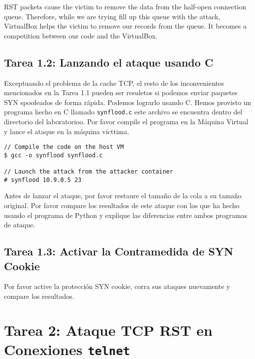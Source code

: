 RST packets cause the victim to remove the data from the half-open connection
queue. Therefore, while we are trying fill up this queue with the attack, 
VirtualBox helps the victim to remove our records from the queue. 
It becomes a competition between our code and the VirtualBox. 


\subsection{Tarea 1.2: Lanzando el ataque usando C} 

Exceptuando el problema de la cache TCP, el resto de los inconvenientes mencionados en la Tarea 1.1 pueden ser resuletos si podemos enviar paquetes SYN spoofeados de forma rápida. Podemos lograrlo usando C. Hemos provisto un programa hecho en C llamado \texttt{synflood.c} este archivo se encuentra dentro del directorio del laboratorioo. Por favor compile el programa en la Máquina Virtual y lance el ataque en la máquina vícttima.

\begin{lstlisting}
// Compile the code on the host VM
$ gcc -o synflood synflood.c

// Launch the attack from the attacker container
# synflood 10.9.0.5 23
\end{lstlisting}

Antes de lanzar el ataque, por favor restaure el tamaño de la cola a su tamaño original. Por favor compare los resultados de este ataque con los que ha hecho usando el programa de Python y explique las diferencias entre ambos programas de ataque.  


\subsection{Tarea 1.3: Activar la Contramedida de SYN Cookie}

Por favor active la protección SYN cookie, corra sus ataques nuevamente y compare los resultados. 


\section {Tarea 2: Ataque TCP RST en Conexiones \texttt{telnet}}

